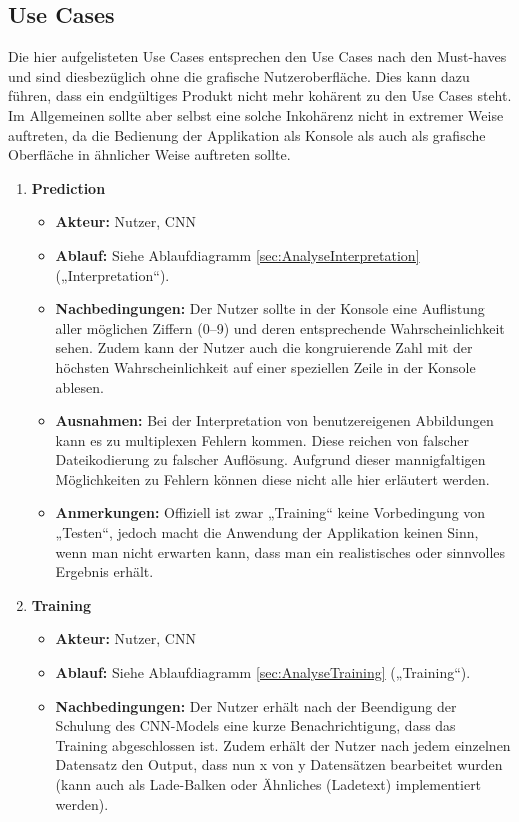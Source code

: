 \subsection{Use Cases}
\label{sec:AnalyseUseCases}
Die hier aufgelisteten Use Cases entsprechen den Use Cases nach den Must-haves und sind diesbezüglich ohne die grafische Nutzeroberfläche. Dies kann dazu führen, dass ein endgültiges Produkt nicht mehr kohärent zu den Use Cases steht. Im Allgemeinen sollte aber selbst eine solche Inkohärenz nicht in extremer Weise auftreten, da die Bedienung der Applikation als Konsole als auch als grafische Oberfläche in ähnlicher Weise auftreten sollte.
\begin{enumerate}
	\item \textbf{Prediction}
		\begin{itemize}
			\item \textbf{Akteur:} Nutzer, CNN
			\item \textbf{Ablauf:} Siehe Ablaufdiagramm \ref{sec:AnalyseInterpretation} („Interpretation“).
			\item \textbf{Nachbedingungen:} Der Nutzer sollte in der Konsole eine Auflistung aller möglichen Ziffern (0–9) und deren entsprechende Wahrscheinlichkeit sehen. Zudem kann der Nutzer auch die kongruierende Zahl mit der höchsten Wahrscheinlichkeit auf einer speziellen Zeile in der Konsole ablesen.
			\item \textbf{Ausnahmen:} Bei der Interpretation von benutzereigenen Abbildungen kann es zu multiplexen Fehlern kommen. Diese reichen von falscher Dateikodierung zu falscher Auflösung. Aufgrund dieser mannigfaltigen Möglichkeiten zu Fehlern können diese nicht alle hier erläutert werden.
			\item \textbf{Anmerkungen:} Offiziell ist zwar „Training“ keine Vorbedingung von „Testen“, jedoch macht die Anwendung der Applikation keinen Sinn, wenn man nicht erwarten kann, dass man ein realistisches oder sinnvolles Ergebnis erhält.
		\end{itemize}
	\item \textbf{Training}
	\begin{itemize}
		\item \textbf{Akteur:} Nutzer, CNN
		\item \textbf{Ablauf:} Siehe Ablaufdiagramm \ref{sec:AnalyseTraining} („Training“).
		\item \textbf{Nachbedingungen:} Der Nutzer erhält nach der Beendigung der Schulung des CNN-Models eine kurze Benachrichtigung, dass das Training abgeschlossen ist. Zudem erhält der Nutzer nach jedem einzelnen Datensatz den Output, dass nun x von y Datensätzen bearbeitet wurden (kann auch als Lade-Balken oder Ähnliches (Ladetext) implementiert werden).

\end{itemize}
\end{enumerate}
